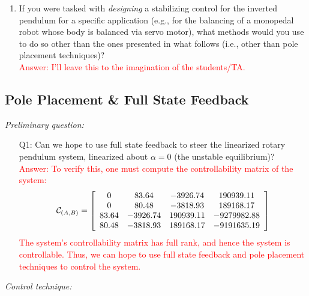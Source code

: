 \documentclass[12pt]{report}
\newcommand\drew[1]{\textcolor{red}{#1}}
\begin{document}
\begin{enumerate}
{          }
    \item If you were tasked with \emph{designing} a stabilizing control for the inverted pendulum for a specific application (e.g., for the balancing of a monopedal robot whose body is balanced via servo motor), what methods would you use to do so other than the ones presented in what follows (i.e., other than pole placement techniques)?\\
          \drew{Answer: I'll leave this to the imagination of the students/TA.}
\end{enumerate}
\subsection{Pole Placement \& Full State Feedback}\label{subsection:lab3_feedback}
\emph{Preliminary question:}
\begin{enumerate}
    \item[Q1:] Can we hope to use full state feedback to steer the linearized rotary pendulum system, linearized about $\alpha = 0$ (the unstable equilibrium)?\\
          \drew{Answer: To verify this, one must compute the controllability matrix of the system:
              \[
                  \mathcal{C}_{(A,B)} =
                  \left[\begin{array}{c c c c}
                          0     & 83.64    & -3926.74  & 190939.11   \\
                          0     & 80.48    & -3818.93  & 189168.17   \\
                          83.64 & -3926.74 & 190939.11 & -9279982.88 \\
                          80.48 & -3818.93 & 189168.17 & -9191635.19
                      \end{array}\right]
              \]
              The system's controllability matrix has full rank, and hence the system is controllable. Thus, we can hope to use full state feedback and pole placement techniques to control the system.}
\end{enumerate}
\emph{Control technique:}
\end{document}
